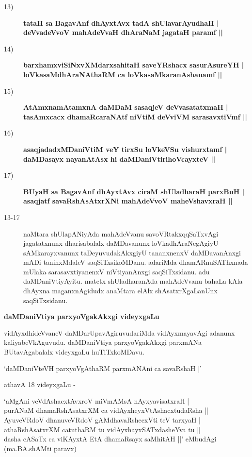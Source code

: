 \begin{description}
\item [13)] {\bf tataH sa BagavAnf dhAyxtAvx tadA shUlavarAyudhaH |\\ deVvadeVvoV mahAdeVvaH dhAraNaM jagataH paramf ||}
\item [14)] {\bf barxhamxviSiNxvXMdarxsahitaH saveYRshacx sasurAsureYH |\\ loVkasaMdhAraNAthaRM ca loVkasaMkaranAshanamf ||}
\item [15)] {\bf AtAmxnamAtamxnA daMDaM sasaqjeV deVvasatatxmaH |\\ tasAmxcacx dhamaRcaraNAtf niVtiM deVviVM sarasavxtiVmf ||}
\item [16)] {\bf asaqjadadxMDaniVtiM veY tirxSu loVkeVSu vishurxtamf |\\ daMDasayx nayanAtAsx hi daMDaniVtirihoVcayxteV ||}
\item [17)] {\bf BUyaH sa BagavAnf dhAyxtAvx ciraM shUladharaH parxBuH |\\ asaqjatf savaRshAsAtxrXNi mahAdeVvoV maheVshavxraH ||}

\item [13-17] naMtara shUlapANiyAda mahAdeVvanu savoVRtakxqqSaTxvAgi jagatatxnunx dharisabalalx daMDavanunx loV\-ka\-dhAraNegAgiyU sAMkarayxvanunx taDeyuvu\-dakAkxgiyU tananxnenxV daMDavanAnxgi mADi taninxMda\-leV saqSiTxsikoMDanu. adariMda dhamARnuSAThxnada mUlaka sarasavxtiyanenxV niVtiyanAnxgi saqSiTxsi\-danu. adu daMDaniVtiyAyitu. matetx shUladharanAda mahAdeVvanu bahaLa kAla dhAyxna maganx\-nAgidudx anaMtara elAlx shAsatxrXgaLanUnx saqSiTxsidanu.
\end{description}

{\noindent
{\large\bf daMDaniVtiya parxyoVgakAkxgi videyxgaLu}}\label{page99}
\medskip

\noindent
vidAyxdhideVvaneV daMDarUpavAgiruvudariMda vidAyxmayavAgi adanunx kaliya\-beVkAguvudu. daM\-Da\-niVtiya parxyoVgakAkxgi parxmANa BUtavAgabalalx videyxgaLu huTiTxkoMDavu.

\begin{shloka}
`daMDaniVteVH parxyoVgAthaRM parxmANAni ca savaRshaH |'\label{99}
\end{shloka}

 athavA 18 videyxgaLu -

\begin{shloka}
`aMgAni veVdAshacxtAvxroV miVmAMsA nAyxyavisatxraH |\\
purANaM dhamaRshAsatxrXM ca vidAyxheyxVtAshacxtudaRsha ||\\

AyuveVRdoV dhanuveVRdoV gAMdhavaRshecxVti teV tarxyaH |\\
athaRshAsatxrXM catuthaRM tu vidAyxhayxSATxdasheYva tu ||\\

dasha cASaTx ca viKAyxtA EtA dhamaRsayx saMhitAH ||' eMbudAgi\\
\hfill{(ma.BA.shAMti paravx)}
\end{shloka}


